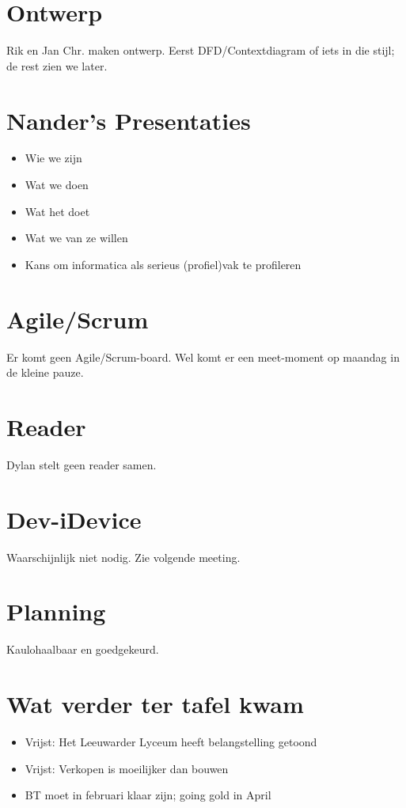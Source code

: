 \documentclass[a4paper, 10pt]{article}
\begin{document}
\section{Ontwerp}

Rik en Jan Chr. maken ontwerp. Eerst DFD/Contextdiagram of iets in die stijl; de
rest zien we later.

\section{Nander's Presentaties}
\begin{itemize}
	\item Wie we zijn
	\item Wat we doen
	\item Wat het doet
	\item Wat we van ze willen
	\item Kans om informatica als serieus (profiel)vak te profileren
\end{itemize}

\section{Agile/Scrum}
Er komt geen Agile/Scrum-board. Wel komt er een meet-moment op maandag in de
kleine pauze.

\section{Reader}
Dylan stelt geen reader samen.

\section{Dev-iDevice}
Waarschijnlijk niet nodig. Zie volgende meeting.

\section{Planning}
Kaulohaalbaar en goedgekeurd.

\section{Wat verder ter tafel kwam}
\begin{itemize}
	\item Vrijst: Het Leeuwarder Lyceum heeft belangstelling getoond
	\item Vrijst: Verkopen is moeilijker dan bouwen
	\item BT moet in februari klaar zijn; going gold in April
\end{itemize}
\end{document}
